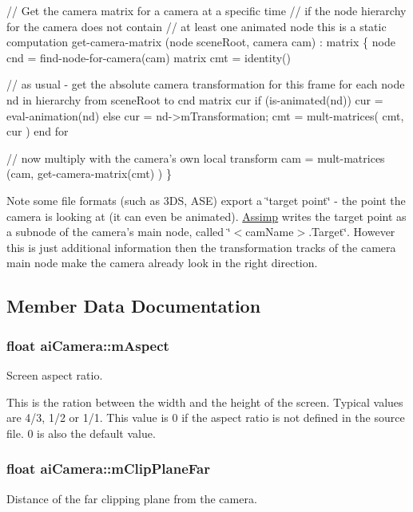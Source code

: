 \begin{DoxyCode}
\textcolor{comment}{// Get the camera matrix for a camera at a specific time}
\textcolor{comment}{// if the node hierarchy for the camera does not contain}
\textcolor{comment}{// at least one animated node this is a static computation}
\textcolor{keyword}{get}-camera-matrix (node sceneRoot, camera cam) : matrix
\{
   node   cnd = find-node-\textcolor{keywordflow}{for}-camera(cam)
   matrix cmt = identity()

   \textcolor{comment}{// as usual - get the absolute camera transformation for this frame}
   for each node nd in hierarchy from sceneRoot to cnd
     matrix cur
     if (is-animated(nd))
        cur = eval-animation(nd)
     else cur = nd->mTransformation;
     cmt = mult-matrices( cmt, cur )
   end for

   \textcolor{comment}{// now multiply with the camera's own local transform}
   cam = mult-matrices (cam, get-camera-matrix(cmt) )
\}
\end{DoxyCode}


\begin{DoxyNote}{Note}
some file formats (such as 3\-D\-S, A\-S\-E) export a \char`\"{}target point\char`\"{} -\/ the point the camera is looking at (it can even be animated). \hyperlink{namespace_assimp}{Assimp} writes the target point as a subnode of the camera's main node, called \char`\"{}$<$cam\-Name$>$.\-Target\char`\"{}. However this is just additional information then the transformation tracks of the camera main node make the camera already look in the right direction. 
\end{DoxyNote}


\subsection{Member Data Documentation}
\hypertarget{structai_camera_ae414556eaa6f910b5927f465d97bf70c}{
\subsubsection[{m\-Aspect}]{\setlength{\rightskip}{0pt plus 5cm}float ai\-Camera\-::m\-Aspect}}\label{structai_camera_ae414556eaa6f910b5927f465d97bf70c}
Screen aspect ratio.

This is the ration between the width and the height of the screen. Typical values are 4/3, 1/2 or 1/1. This value is 0 if the aspect ratio is not defined in the source file. 0 is also the default value. \hypertarget{structai_camera_aa9ccf77e3d7ca3dc8f46df931b65172f}{
\subsubsection[{m\-Clip\-Plane\-Far}]{\setlength{\rightskip}{0pt plus 5cm}float ai\-Camera\-::m\-Clip\-Plane\-Far}}\label{structai_camera_aa9ccf77e3d7ca3dc8f46df931b65172f}
Distance of the far clipping plane from the camera.

